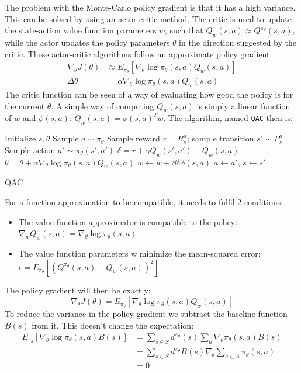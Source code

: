 \documentclass[a4paper]{article}
\begin{document}
The problem with the Monte-Carlo policy gradient is that it has a high variance. This can be solved by using an actor-critic method. The critic is used to update the state-action value function parameters $w$, such that $Q_w(s,a) \approx Q^{\pi_{\theta}}(s,a)$, while the actor updates the policy parameters $\theta$ in the direction suggested by the critic. These actor-critic algorithms follow an approximate policy gradient:
\begin{align}
\nabla_{\theta}J(\theta) &\approx E_{\pi_{\theta}}[\nabla_{\theta} \log \pi_{\theta}(s,a) Q_w(s,a)]\\
\Delta \theta &= \alpha \nabla_{\theta} \log \pi_{\theta}(s,a) Q_w(s,a)
\end{align}
The critic function can be seen of a way of evaluating how good the policy is for the current $\theta$. A simple way of computing $Q_w(s,a)$ is simply a linear function of $w$ and $\phi(s,a)$: $Q_w(s,a) = \phi(s,a)^T w$. The algorithm, named \texttt{QAC} then is:\\
\begin{algorithm}[H]
\DontPrintSemicolon
Initialize $s,\theta$\;
Sample $a \sim \pi_{\theta}$\;
 {
	Sample reward $r = R_s^a$; sample transition $s' \sim P_s^a$\;
    Sample action $a' \sim \pi_{\theta}(s',a')$\;
    $\delta = r + \gamma Q_w(s',a') - Q_w(s,a)$\;
    $\theta = \theta + \alpha \nabla_{\theta} \log \pi_{\theta}(s,a)Q_w(s,a)$\;
    $w \gets w + \beta \delta \phi (s,a)$\;
    $a \gets a'$, $s \gets s'$\;
    }
\caption{QAC}
\end{algorithm}
For a function approximation to be compatible, it needs to fulfil 2 conditions:
\begin{itemize}
\item The value function approximator is compatible to the policy: $\nabla_w Q_w(s,a) = \nabla_{\theta} \log \pi_{\theta}(s,a)$
\item The value function parameters w minimize the mean-squared error: $\epsilon = E_{\pi_{\theta}} [(Q^{\pi_{\theta}}(s,a) - Q_w(s,a))^2]$
\end{itemize}
The policy gradient will then be exactly:
\begin{equation}
\nabla_{\theta}J(\theta) = E_{\pi_{\theta}} [\nabla_{\theta} \log \pi_{\theta}(s,a) Q_w(s,a)]
\end{equation}
To reduce the variance in the policy gradient we subtract the baseline function $B(s)$ from it. This doesn't change the expectation:
\begin{align}
E_{\pi_{\theta}} [\nabla_{\theta} \log \pi_{\theta}(s,a)B(s)] &= \sum_{s \in S} d^{\pi_{\theta}}(s) \sum_a \nabla_{\theta} \pi_{\theta}(s,a)B(s)\\
&= \sum_{s \in S} d^{\pi_{\theta}}B(s)\nabla_{\theta} \sum_{a \in A} \pi_{\theta} (s,a)\\
&= 0
\end{align}
\end{document}
